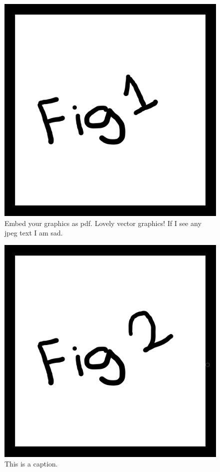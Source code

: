 \documentclass[preprint,3p,11pt,sort]{elsarticle}
\begin{document}
\begin{figure}
	\centering
	\centerline{\includegraphics[width=\textwidth,keepaspectratio]{Figures/ExampleFigure1.png}}
	\caption{Embed your graphics as pdf. Lovely vector graphics! If I see any jpeg text I am sad.}
	\label{fig:Example1}
\end{figure}

\begin{figure}
	\centering
	\centerline{\includegraphics[width=\textwidth,keepaspectratio]{Figures/ExampleFigure2.png}}
	\caption{This is a caption.}
	\label{fig:Example2}
\end{figure}
\end{document}
